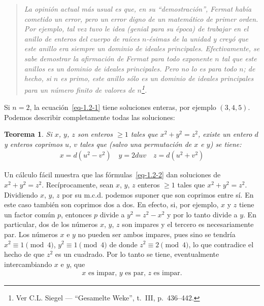 \documentclass[bibtotoc,leqno,spanish]{amsbook}
\numberwithin{equation}{section}
\newenvironment{comm}%
	{\begin{quotation}\itshape}
	{\end{quotation}}
\theoremstyle{note}
\theoremstyle{note}
\newtheorem{theorem}{Teorema}
\theoremstyle{rem}
\numberwithin{theorem}{section}
\numberwithin{proposition}{section}
\numberwithin{definition}{section}
\numberwithin{lemma}{section}
\numberwithin{corollary}{section}
\numberwithin{example}{section}
\numberwithin{footnote}{section}%
\begin{document}
\begin{comm}
La opini\'on actual m\'as usual es que, en su ``demostraci\'on'', Fermat hab\'ia cometido
un error, pero un error digno de un matem\'atico de primer orden. Por ejemplo, tal vez
tuvo le idea (genial para su \'epoca) de trabajar en el anillo de enteros del cuerpo de
ra\'ices $n$-\'esimas de la unidad y crey\'o que este anillo era siempre un dominio de ideales
principales. Efectivamente, se sabe demostrar la afirmaci\'on de Fermat para todo exponente $n$
tal que este anillos es un dominio de ideales principales. Pero no lo es para todo $n$;
de hecho,
si $n$ es primo, este anillo s\'olo es un dominio de ideales principales para un n\'umero
finito de valores de $n$\footnote{Ver C.L. Siegel --- ``Gesamelte Weke'', t.~III, p.~436--442.}.
\end{comm}

Si $n=2$, la ecuaci\'on~\eqref{eq-1.2-1} tiene soluciones enteras, por
ejemplo $(3,4,5)$. Podemos describir completamente todas las soluciones:

\begin{theorem}\label{teo1.2.1}
Si $x$, $y$, $z$ son enteros $\geq 1$ tales que $x^{2}+y^{2}=z^{2}$, existe un entero
$d$ y enteros coprimos $u$, $v$ tales que (salvo una permutaci\'on de $x$ e $y$) se tiene:
\begin{gather}\label{eq-1.2-2}
x = d(u^{2}-v^{2})\quad y = 2duv\quad z = d(u^{2}+v^{2})
\end{gather}
\end{theorem}

Un c\'alculo f\'acil muestra que las f\'ormulas~\eqref{eq-1.2-2} dan soluciones
de $x^{2}+y^{2}=z^{2}$.
Rec\'iprocamente, sean $x$, $y$, $z$ enteros $\geq 1$ tales que $x^{2}+y^{2}=z^{2}$. Dividiendo
$x$, $y$, $z$ por su m.c.d. podemos suponer que son coprimos entre s\'i. En este caso tambi\'en
son coprimos dos a dos. En efecto, si, por ejemplo, $x$ y $z$ tiene un factor com\'un $p$, entonces
$p$ divide a $y^{2} = z^{2}-x^{2}$ y por lo tanto divide a $y$. En particular, dos de
los n\'umeros
$x$, $y$, $z$ son impares y el tercero es necesariamente par. Los n\'umeros $x$ e $y$ no
pueden ser ambos impares, pues sino se tendr\'ia $x^{2}\equiv 1\pmod 4$, $y^{2}\equiv 1\pmod 4$
de donde $z^{2}\equiv 2\pmod 4$, lo que contradice el hecho de que $z^{2}$ es un cuadrado.
Por lo tanto se tiene, eventualmente intercambiando $x$ e $y$, que
\begin{gather}\label{eq-1.2-3}
\text{$x$ es impar, $y$ es par, $z$ es impar.}
\end{gather}
\end{document}
